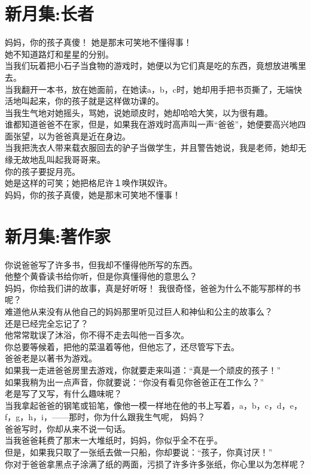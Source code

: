 \documentclass[
]{book}
\renewenvironment{quote}{\begin{VF}}{\end{VF}}
\begin{document}
\hypertarget{section-48}{%
\section{新月集:长者}\label{section-48}}

\begin{quote}
妈妈，你的孩子真傻！ 她是那末可笑地不懂得事！\\
她不知道路灯和星星的分别。\\
当我们玩着把小石子当食物的游戏时，她便以为它们真是吃的东西，竟想放进嘴里去。\\
当我翻开一本书，放在她面前，在她读a，b，c时，她却用手把书页撕了，无端快活地叫起来，你的孩子就是这样做功课的。\\
当我生气地对她摇头，骂她，说她顽皮时，她却哈哈大笑，以为很有趣。\\
谁都知道爸爸不在家，但是，如果我在游戏时高声叫一声``爸爸''，她便要高兴地四面张望，以为爸爸真是近在身边。\\
当我把洗衣人带来载衣服回去的驴子当做学生，并且警告她说，我是老师，她却无缘无故地乱叫起我哥哥来。\\
你的孩子要捉月亮。\\
她是这样的可笑；她把格尼许１唤作琪奴许。\\
妈妈，你的孩子真傻，她是那末可笑地不懂事！
\end{quote}

\hypertarget{section-49}{%
\section{新月集:著作家}\label{section-49}}

\begin{quote}
你说爸爸写了许多书，但我却不懂得他所写的东西。\\
他整个黄昏读书给你听，但是你真懂得他的意思么？\\
妈妈，你给我们讲的故事，真是好听呀！ 我很奇怪，爸爸为什么不能写那样的书呢？\\
难道他从来没有从他自己的妈妈那里听见过巨人和神仙和公主的故事么？\\
还是已经完全忘记了？\\
他常常耽误了沐浴，你不得不走去叫他一百多次。\\
你总要等候着，把他的菜温着等他，但他忘了，还尽管写下去。\\
爸爸老是以著书为游戏。\\
如果我一走进爸爸房里去游戏，你就要走来叫道：``真是一个顽皮的孩子！''\\
如果我稍为出一点声音，你就要说：``你没有看见你爸爸正在工作么？''\\
老是写了又写，有什么趣味呢？\\
当我拿起爸爸的钢笔或铅笔，像他一模一样地在他的书上写着，a，b，c，d，e，f，g，h，i，------那时，你为什么跟我生气呢， 妈妈？\\
爸爸写时，你却从来不说一句话。\\
当我爸爸耗费了那末一大堆纸时，妈妈，你似乎全不在乎。\\
但是，如果我只取了一张纸去做一只船，你却要说：``孩子，你真讨厌！''\\
你对于爸爸拿黑点子涂满了纸的两面，污损了许多许多张纸，你心里以为怎样呢？
\end{quote}
\end{document}
